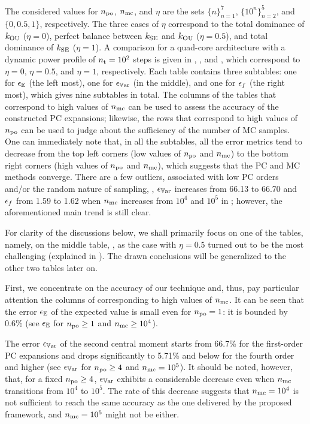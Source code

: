 The considered values for ${n_\text{po}}$, ${n_\text{mc}}$, and $\eta$ are the sets $\{ n \}_{n = 1}^7$, $\{ 10^n \}_{n = 2}^5$, and $\{ 0, 0.5, 1 \}$, respectively.
The three cases of $\eta$ correspond to the total dominance of $k_{\text{OU}}$ ($\eta = 0$), perfect balance between $k_{\text{SE}}$ and $k_{\text{OU}}$ ($\eta = 0.5$), and total dominance of $k_{\text{SE}}$ ($\eta = 1$).
A comparison for a quad-core architecture with a dynamic power profile of ${n_\text{t}} = 10^2$ steps is given in , , and , which correspond to $\eta = 0$, $\eta = 0.5$, and $\eta = 1$, respectively.
Each table contains three subtables: one for $\epsilon_\mathbb{E}$ (the left most), one for $\epsilon_{\mathbb{V}\text{ar}}$ (in the middle), and one for $\epsilon_f$ (the right most), which gives nine subtables in total.
The columns of the tables that correspond to high values of ${n_\text{mc}}$ can be used to assess the accuracy of the constructed PC expansions; likewise, the rows that correspond to high values of ${n_\text{po}}$ can be used to judge about the sufficiency of the number of MC samples.
One can immediately note that, in all the subtables, all the error metrics tend to decrease from the top left corners (low values of ${n_\text{po}}$ and ${n_\text{mc}}$) to the bottom right corners (high values of ${n_\text{po}}$ and ${n_\text{mc}}$), which suggests that the PC and MC methods converge.
There are a few outliers, associated with low PC orders and/or the random nature of sampling, \eg, $\epsilon_{\mathbb{V}\text{ar}}$ increases from 66.13 to 66.70 and $\epsilon_f$ from 1.59 to 1.62 when ${n_\text{mc}}$ increases from $10^4$ and $10^5$ in ; however, the aforementioned main trend is still clear.

For clarity of the discussions below, we shall primarily focus on one of the tables, namely, on the middle table, , as the case with $\eta = 0.5$ turned out to be the most challenging (explained in ).
The drawn conclusions will be generalized to the other two tables later on.



First, we concentrate on the accuracy of our technique and, thus, pay particular attention the columns of  corresponding to high values of ${n_\text{mc}}$.
It can be seen that the error $\epsilon_\mathbb{E}$ of the expected value is small even for ${n_\text{po}} = 1$: it is bounded by 0.6\% (see $\epsilon_\mathbb{E}$ for ${n_\text{po}} \geq 1$ and ${n_\text{mc}} \geq 10^4$).

The error $\epsilon_{\mathbb{V}\text{ar}}$ of the second central moment starts from 66.7\% for the first-order PC expansions and drops significantly to 5.71\% and below for the fourth order and higher (see $\epsilon_{\mathbb{V}\text{ar}}$ for ${n_\text{po}} \geq 4$ and ${n_\text{mc}} = 10^5$).
It should be noted, however, that, for a fixed ${n_\text{po}} \geq 4$, $\epsilon_{\mathbb{V}\text{ar}}$ exhibits a considerable decrease even when ${n_\text{mc}}$ transitions from $10^4$ to $10^5$.
The rate of this decrease suggests that ${n_\text{mc}} = 10^4$ is not sufficient to reach the same accuracy as the one delivered by the proposed framework, and ${n_\text{mc}} = 10^5$ might not be either.

